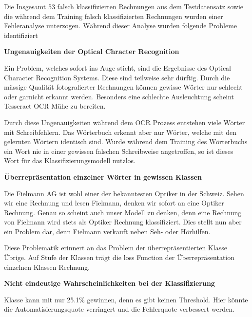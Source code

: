 Die Insgesamt 53 falsch klassifizierten Rechnungen aus dem Testdatensatz sowie die während dem Training falsch klassifizierten Rechnungen wurden einer Fehleranalyse unterzogen. Während dieser Analyse wurden folgende Probleme identifiziert 

\textbf{Ungenauigkeiten der Optical Chracter Recognition}

Ein Problem, welches sofort ins Auge sticht, sind die Ergebnisse des Optical Character Recognition Systems. Diese sind teilweise sehr dürftig. Durch die mässige Qualität fotografierter Rechnungen können gewisse Wörter nur schlecht oder garnicht erkannt werden. Besonders eine schlechte Ausleuchtung scheint Tesseract OCR Mühe zu bereiten.

Durch diese Ungenauigkeiten während dem OCR Prozess entstehen viele Wörter mit Schreibfehlern. Das Wörterbuch erkennt aber nur Wörter, welche mit den gelernten Wörtern identisch sind. Wurde während dem Training des Wörterbuchs ein Wort nie in einer gewissen falschen Schreibweise angetroffen, so ist dieses Wort für das Klassifizierungsmodell nutzlos.

\textbf{Überrepräsentation einzelner Wörter in gewissen Klassen}

Die Fielmann AG ist wohl einer der bekanntesten Optiker in der Schweiz. Sehen wir eine Rechnung und lesen Fielmann, denken wir sofort an eine Optiker Rechnung. Genau so scheint auch unser Modell zu denken, denn eine Rechnung von Fielmann wird stets als Optiker Rechnung klassifiziert. Dies stellt nun aber ein Problem dar, denn Fielmann verkauft neben Seh- oder Hörhilfen. 

Diese Problematik erinnert an das Problem der überrepräsentierten Klasse Übrige. Auf Stufe der Klassen trägt die loss Function der Überrepräsentation einzelnen Klassen Rechnung. 

\textbf{Nicht eindeutige Wahrscheinlichkeiten bei der Klassifizierung}

Klasse kann mit nur 25.1\% gewinnen, denn es gibt keinen Threshold. Hier könnte die Automatisierungsquote verringert und die Fehlerquote verbessert werden.


